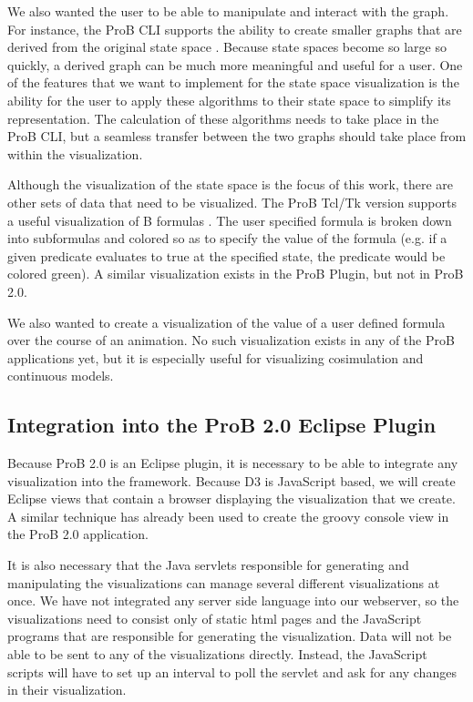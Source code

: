 We also wanted the user to be able to manipulate and interact with the graph. For instance, the ProB CLI supports the ability to create smaller graphs that are derived from the original state space \cite{LeTu05_8}. Because state spaces become so large so quickly, a derived graph can be much more meaningful and useful for a user. One of the features that we want to implement for the state space visualization is the ability for the user to apply these algorithms to their state space to simplify its representation. The calculation of these algorithms needs to take place in the ProB CLI, but a seamless transfer between the two graphs should take place from within the visualization.

Although the visualization of the state space is the focus of this work, there are other sets of data that need to be visualized. The ProB Tcl/Tk version supports a useful visualization of B formulas \cite{LeSaBeLu08_228}. The user specified formula is broken down into subformulas and colored so as to specify the value of the formula (e.g. if a given predicate evaluates to true at the specified state, the predicate would be colored green). A similar visualization exists in the ProB Plugin, but not in ProB 2.0.

We also wanted to create a visualization of the value of a user defined formula over the course of an animation. No such visualization exists in any of the ProB applications yet, but it is especially useful for visualizing cosimulation and continuous models.

\subsection{Integration into the ProB 2.0 Eclipse Plugin}

Because ProB 2.0 is an Eclipse plugin, it is necessary to be able to integrate any visualization into the framework. Because D3 is JavaScript based, we will create Eclipse views that contain a browser displaying the visualization that we create. A similar technique has already been used to create the groovy console view in the ProB 2.0 application.

It is also necessary that the Java servlets responsible for generating and manipulating the visualizations can manage several different visualizations at once. We have not integrated any server side language into our webserver, so the visualizations need to consist only of static html pages and the JavaScript programs that are responsible for generating the visualization. Data will not be able to be sent to any of the visualizations directly. Instead, the JavaScript scripts will have to set up an interval to poll the servlet and ask for any changes in their visualization.

